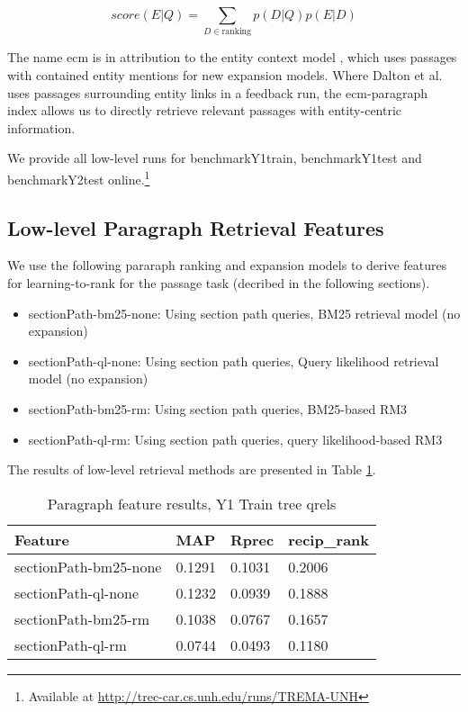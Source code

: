 \documentclass{article}
\begin{document}
$$ score(E|Q)= \sum_{D\in \text{ranking}} p(D|Q) p(E|D)$$

The name ecm is in attribution to the entity context model \cite{dalton2014entity}, which uses passages with contained entity mentions for new expansion models. Where Dalton et al.\ \cite{dalton2014entity} uses passages surrounding entity links in a feedback run, the ecm-paragraph index allows us to directly retrieve relevant passages with entity-centric information.


We provide all low-level runs for benchmarkY1train, benchmarkY1test and benchmarkY2test online.\footnote{Available at \url{http://trec-car.cs.unh.edu/runs/TREMA-UNH}} 


\subsection{Low-level Paragraph Retrieval Features}\label{sec:para}

We  use the following pararaph ranking and expansion models to derive features for  learning-to-rank for the passage task (decribed in the following sections).
\begin{itemize}
    \item sectionPath-bm25-none: Using section path queries, BM25 retrieval model (no expansion) 
    \item sectionPath-ql-none: Using section path queries, Query likelihood retrieval model (no expansion)
    \item sectionPath-bm25-rm: Using section path queries, BM25-based RM3
    \item sectionPath-ql-rm: Using section path queries, query likelihood-based RM3
\end{itemize}

The results of low-level retrieval methods are presented in Table \ref{tab:para}.

\begin{table}[tb]
\centering
\begin{tabular}{l l l l}
\hline
\textbf{Feature} & \textbf{MAP} & \textbf{Rprec} & \textbf{recip\_rank}\\
\hline
sectionPath-bm25-none & 0.1291 & 0.1031 & 0.2006 \\
sectionPath-ql-none & 0.1232 & 0.0939 & 0.1888 \\
sectionPath-bm25-rm & 0.1038 & 0.0767 & 0.1657 \\
sectionPath-ql-rm & 0.0744 & 0.0493 & 0.1180 \\
\hline
\end{tabular}
\caption{Paragraph feature results, Y1 Train tree qrels}\label{tab:para}
\end{table}
\end{document}
